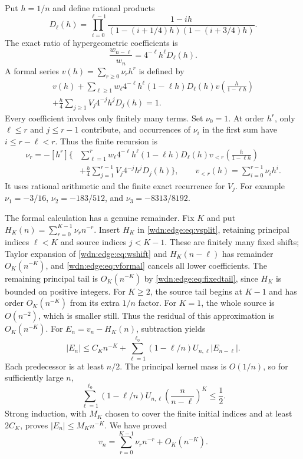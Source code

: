 \documentclass[11pt,letterpaper]{article}
\theoremstyle{remark}\newtheorem{remark}[theorem]{Remark}
\begin{document}
Put $h=1/n$ and define rational products
\begin{equation}\label{wdn:edge:eq:D}
 D_\ell(h)=\prod_{i=0}^{\ell-1}
 \frac{1-ih}{(1-(i+1/4)h)(1-(i+3/4)h)}.
\end{equation}
The exact ratio of hypergeometric coefficients is
\begin{equation}\label{wdn:edge:eq:wshift}
 \frac{w_{n-\ell}}{w_n}=4^{-\ell}h^\ell D_\ell(h).
\end{equation}
A formal series $v(h)=\sum_{r\ge0}\nu_rh^r$ is defined by
\begin{multline}\label{wdn:edge:eq:vformal}
 v(h)+\sum_{\ell\ge1}w_\ell4^{-\ell}h^\ell(1-\ell h)D_\ell(h)
               v\left(\frac h{1-\ell h}\right)\\
 +\frac h4\sum_{j\ge1}V_j4^{-j}h^jD_j(h)=1.
\end{multline}
Every coefficient involves only finitely many terms. Set $\nu_0=1$.
At order $h^r$, only $\ell\le r$ and $j\le r-1$ contribute, and
occurrences of $\nu_i$ in the first sum have $i\le r-\ell<r$.
Thus the finite recursion is
\begin{equation}\label{wdn:edge:eq:nurec}
 \begin{split}
 \nu_r=-[h^r]\Bigg\{&\sum_{\ell=1}^{r}w_\ell4^{-\ell}h^\ell
 (1-\ell h)D_\ell(h)v_{<r}\left(\frac h{1-\ell h}\right)\\
 &+\frac h4\sum_{j=1}^{r-1}V_j4^{-j}h^jD_j(h)\Bigg\},\qquad
 v_{<r}(h)=\sum_{i=0}^{r-1}\nu_i h^i.
 \end{split}
\end{equation}
It uses rational arithmetic and the finite exact recurrence for $V_j$.
For example $\nu_1=-3/16$, $\nu_2=-183/512$, and
$\nu_3=-8313/8192$.

The formal calculation has a genuine remainder. Fix $K$ and put
$H_K(n)=\sum_{r=0}^{K-1}\nu_rn^{-r}$. Insert $H_K$ in
\eqref{wdn:edge:eq:vsplit}, retaining principal indices $\ell<K$ and source
indices $j<K-1$. These are finitely many fixed shifts; Taylor expansion
of \eqref{wdn:edge:eq:wshift} and $H_K(n-\ell)$ has remainder $O_K(n^{-K})$,
and \eqref{wdn:edge:eq:vformal} cancels all lower coefficients. The remaining
principal tail is $O_K(n^{-K})$ by \eqref{wdn:edge:eq:fixedtail}, since $H_K$
is bounded on positive integers. For $K\ge2$, the source tail begins
at $K-1$ and has order $O_K(n^{-K})$ from its extra $1/n$ factor.
For $K=1$, the whole source is $O(n^{-2})$, which is smaller still.
Thus the residual of this approximation is $O_K(n^{-K})$.
For $E_n=v_n-H_K(n)$, subtraction yields
\[
 |E_n|\le C_Kn^{-K}
 +\sum_{\ell=1}^{\ell_0}(1-\ell/n)U_{n,\ell}|E_{n-\ell}|.
\]
Each predecessor is at least $n/2$. The principal kernel mass is
$O(1/n)$, so for sufficiently large $n$,
\[
 \sum_{\ell=1}^{\ell_0}(1-\ell/n)U_{n,\ell}
                  \left(\frac n{n-\ell}\right)^K\le\frac12.
\]
Strong induction, with $M_K$ chosen to cover the finite initial indices
and at least $2C_K$, proves $|E_n|\le M_Kn^{-K}$. We have proved
\begin{equation}\label{wdn:edge:eq:vallorders}
 v_n=\sum_{r=0}^{K-1}\nu_rn^{-r}+O_K(n^{-K}).
\end{equation}
\end{document}
